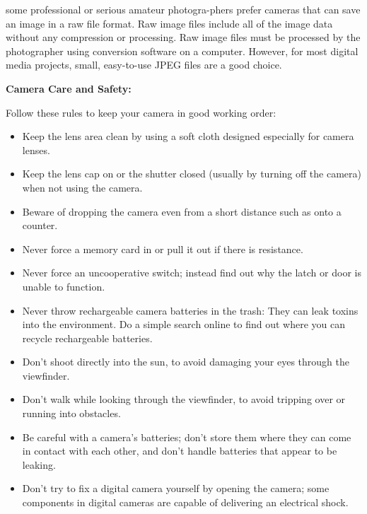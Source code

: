 \documentclass{report}
\begin{document}
    \bigbreak \noindent 

    \bigbreak \noindent 
    some professional or serious amateur photogra-phers prefer cameras that can save an image in a raw file format. Raw image files include all of the image data without any compression or processing. Raw image files must be processed by the photographer using conversion software on a computer. However, for most digital media projects, small, easy-to-use JPEG files are a good choice.

    \pagebreak
    \begin{Large}
        \noindent \textbf{Camera Care and Safety:}
    \end{Large}

    \bigbreak \noindent 
    Follow these rules to keep your camera in good working order:

    \bigbreak \noindent 
    \begin{itemize}
        \item Keep the lens area clean by using a soft cloth designed especially for camera lenses.
        \item Keep the lens cap on or the shutter closed (usually by turning off the camera) when not using the camera.
        \item Beware of dropping the camera even from a short distance such as onto a counter.
        \item Never force a memory card in or pull it out if there is resistance.
        \item Never force an uncooperative switch; instead find out why the latch or door is unable to function.
        \item Never throw rechargeable camera batteries in the trash: They can leak toxins into the environment. Do a simple search online to find out where you can recycle rechargeable batteries.
        \item Don’t shoot directly into the sun, to avoid damaging your eyes through the viewfinder.
        \item Don’t walk while looking through the viewfinder, to avoid tripping over or running into obstacles.
        \item Be careful with a camera’s batteries; don’t store them where they can come in contact with each other, and don’t handle batteries that appear to be leaking.
        \item Don’t try to fix a digital camera yourself by opening the camera; some components in digital cameras are capable of delivering an electrical shock.
    \end{itemize}
\end{document}
